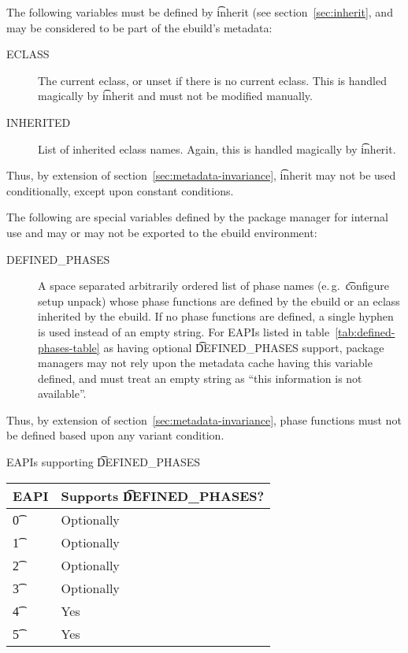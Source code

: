 The following variables must be defined by \t{inherit} (see section~\ref{sec:inherit}, and may be
considered to be part of the ebuild's metadata:

\begin{description}
\item[ECLASS] The current eclass, or unset if there is no current eclass. This is handled magically
    by \t{inherit} and must not be modified manually.
\item[INHERITED] List of inherited eclass names. Again, this is handled magically by \t{inherit}.
\end{description}

\note Thus, by extension of section~\ref{sec:metadata-invariance}, \t{inherit} may not be used
    conditionally, except upon constant conditions.

The following are special variables defined by the package manager for internal use and may or may
not be exported to the ebuild environment:

\begin{description}
\item[DEFINED\_PHASES]  A space separated arbitrarily ordered list of
phase names (e.\,g.\ \t{configure setup unpack}) whose phase functions are defined by the ebuild or
an eclass inherited by the ebuild. If no phase functions are defined, a single hyphen is used
instead of an empty string. For EAPIs listed in table~\ref{tab:defined-phases-table} as having
optional \t{DEFINED\_PHASES} support, package managers may not rely upon the metadata cache having
this variable defined, and must treat an empty string as ``this information is not available''.
\end{description}

\note Thus, by extension of section~\ref{sec:metadata-invariance}, phase functions must not be defined
based upon any variant condition.

\begin{centertable}{EAPIs supporting \t{DEFINED\_PHASES}} \label{tab:defined-phases-table}
    \begin{tabular}{ l l }
        \toprule
        \multicolumn{1}{c}{\textbf{EAPI}} &
        \multicolumn{1}{c}{\textbf{Supports \t{DEFINED\_PHASES}?}} \\
        \midrule
    \t{0} & Optionally \\
    \t{1} & Optionally \\
    \t{2} & Optionally \\
    \t{3} & Optionally \\
    \t{4} & Yes \\
    \t{5} & Yes \\
    \bottomrule
    \end{tabular}
\end{centertable}


